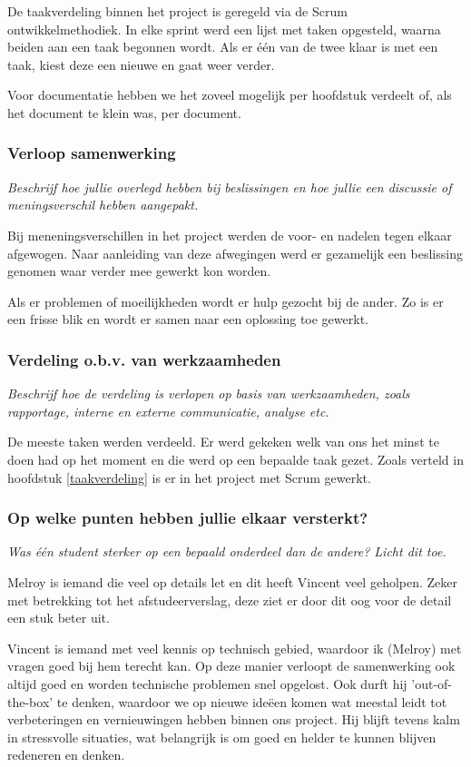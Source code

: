 \documentclass[]{article}
\begin{document}
De taakverdeling binnen het project is geregeld via de Scrum
ontwikkelmethodiek. In elke sprint werd een lijst met taken opgesteld, waarna
beiden aan een taak begonnen wordt. Als er \'e\'en van de twee klaar is met een
taak, kiest deze een nieuwe en gaat weer verder. 

Voor documentatie hebben we het zoveel mogelijk per hoofdstuk verdeelt of, als
het document te klein was, per document.

\subsubsection{Verloop samenwerking}
\textit{Beschrijf hoe jullie overlegd hebben bij beslissingen en hoe jullie een
discussie of meningsverschil hebben aangepakt.}

Bij meneningsverschillen in het project werden de voor- en nadelen tegen elkaar
afgewogen. Naar aanleiding van deze afwegingen werd er gezamelijk een beslissing
genomen waar verder mee gewerkt kon worden.

Als er problemen of moeilijkheden wordt er hulp gezocht bij de ander. Zo is er
een frisse blik en wordt er samen naar een oplossing toe gewerkt.


\subsubsection{Verdeling o.b.v. van werkzaamheden}
\textit{Beschrijf hoe de verdeling is verlopen op basis van werkzaamheden, zoals
rapportage, interne en externe communicatie, analyse etc.}

De meeste taken werden verdeeld. Er werd gekeken welk van ons het minst te doen
had op het moment en die werd op een bepaalde taak gezet. Zoals verteld in
hoofdstuk \ref{taakverdeling} is er in het project met Scrum gewerkt.


\subsubsection{Op welke punten hebben jullie elkaar versterkt?}
\textit{Was \'e\'en student sterker op een bepaald onderdeel dan de andere?
Licht dit toe.}

Melroy is iemand die veel op details let en dit heeft Vincent veel geholpen.
Zeker met betrekking tot het afstudeerverslag, deze ziet er door dit oog voor de
detail een stuk beter uit.

Vincent is iemand met veel kennis op technisch gebied, waardoor ik (Melroy) met vragen
goed bij hem terecht kan. Op deze manier verloopt de samenwerking ook altijd
goed en worden technische problemen snel opgelost. Ook durft hij
'out-of-the-box' te denken, waardoor we op nieuwe ide\"een komen wat meestal
leidt tot verbeteringen en vernieuwingen hebben binnen ons project. Hij blijft
tevens kalm in stressvolle situaties, wat belangrijk is om goed en helder te
kunnen blijven redeneren en denken. 
\end{document}
